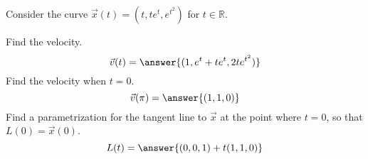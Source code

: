 \begin{problem}
Consider the curve $\vec{x}(t) = (t, te^t, e^{t^2})$ for $t\in\mathbb{R}$.

Find the velocity.
\[
\vec{v}(t) = \answer{(1, e^t+te^t, 2te^{t^2})}
\]
Find the velocity when $t = 0$.
\[
\vec{v}(\pi) = \answer{(1,1,0)}
\]
Find a parametrization for the tangent line to $\vec{x}$ at the point where $t = 0$, so that $L(0) = \vec{x}(0)$.
\[
L(t) = \answer{(0,0,1) + t(1,1,0)}
\]
\end{problem}